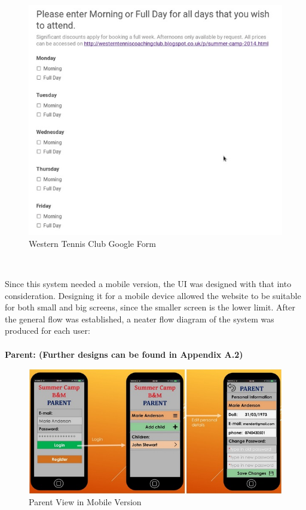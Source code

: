 \documentclass{l3proj}
\begin{document}
\\ 
{
\begin{figure}[h]
\caption{Western Tennis Club Google Form}
\centering
\includegraphics[scale=0.45]{googleDocsForm.jpg}
\end{figure}
}
\\
\par 
Since this system needed a mobile version, the UI was designed with that into consideration. Designing it for a mobile device allowed the website to be suitable for both small and big screens, since the smaller screen is the lower limit. After the general flow was established, a neater flow diagram of the system was produced for each user:\\
\\ \textbf{Parent: (Further designs can be found in Appendix A.2)}\\
{
\begin{figure}[h]
\caption{Parent View in Mobile Version}
\centering
\includegraphics[scale=0.60]{diagramdraft2Parent.jpg}
\end{figure}
}
\end{document}

